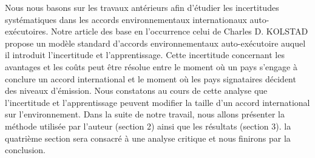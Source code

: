 \documentclass[12pt]{article}
\begin{document}
\par Nous nous basons sur les travaux antérieurs afin d'étudier les incertitudes systématiques dans les accords environnementaux internationaux auto-exécutoires. Notre article des base en l'occurrence celui de Charles D. KOLSTAD propose un modèle standard d'accords environnementaux auto-exécutoire auquel il introduit l'incertitude et l'apprentissage.  Cette incertitude concernant les avantages et les coûts peut être résolue entre le moment où un pays s'engage à conclure un accord international et le moment où les pays signataires décident des niveaux d'émission. Nous constatons au cours de cette analyse que l'incertitude et l'apprentissage peuvent modifier la taille d'un accord international sur l'environnement. Dans la suite de notre travail, nous allons présenter la méthode utilisée par l'auteur (section 2) ainsi que les résultats (section 3). la quatrième section sera consacré à une analyse critique  et nous finirons par la conclusion.
\end{document}
